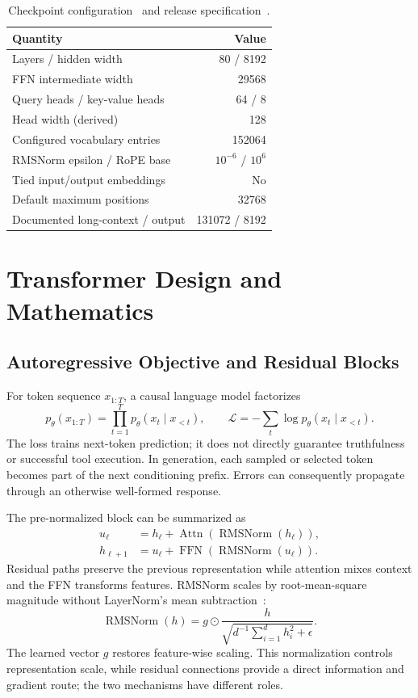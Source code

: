 \documentclass[conference]{IEEEtran}
\begin{document}
\begin{table}[t]
\caption{Checkpoint configuration~\cite{config} and release specification~\cite{card}.}
\centering\small
\begin{tabular}{lr}\toprule
Quantity & Value\\\midrule
Layers / hidden width & 80 / 8192\\
FFN intermediate width & 29568\\
Query heads / key-value heads & 64 / 8\\
Head width (derived) & 128\\
Configured vocabulary entries & 152064\\
RMSNorm epsilon / RoPE base & $10^{-6}$ / $10^6$\\
Tied input/output embeddings & No\\
Default maximum positions & 32768\\
Documented long-context / output & 131072 / 8192\\\bottomrule
\end{tabular}
\label{tab:spec}
\end{table}

\section{Transformer Design and Mathematics}
\subsection{Autoregressive Objective and Residual Blocks}
For token sequence $x_{1:T}$, a causal language model factorizes
\begin{equation}
p_\theta(x_{1:T})=\prod_{t=1}^{T}p_\theta(x_t\mid x_{<t}),\qquad
\mathcal{L}=-\sum_t\log p_\theta(x_t\mid x_{<t}).
\end{equation}
The loss trains next-token prediction; it does not directly guarantee truthfulness or successful tool execution. In generation, each sampled or selected token becomes part of the next conditioning prefix. Errors can consequently propagate through an otherwise well-formed response.

The pre-normalized block can be summarized as
\begin{align}
u_\ell &= h_\ell+\operatorname{Attn}(\operatorname{RMSNorm}(h_\ell)),\\
h_{\ell+1}&=u_\ell+\operatorname{FFN}(\operatorname{RMSNorm}(u_\ell)).
\end{align}
Residual paths preserve the previous representation while attention mixes context and the FFN transforms features. RMSNorm scales by root-mean-square magnitude without LayerNorm's mean subtraction~\cite{rms}:
\begin{equation}
\operatorname{RMSNorm}(h)=g\odot\frac{h}
{\sqrt{d^{-1}\sum_{i=1}^{d}h_i^2+\epsilon}}.
\end{equation}
The learned vector $g$ restores feature-wise scaling. This normalization controls representation scale, while residual connections provide a direct information and gradient route; the two mechanisms have different roles.
\end{document}
